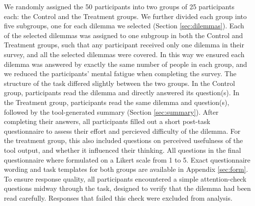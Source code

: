 We randomly assigned the 50 participants into two groups of 25 participants each: the Control and the Treatment groups.
We further divided each group into five subgroups, one for each dilemma we selected (Section \ref{sec:dilemmas}).
Each of the selected dilemmas was assigned to one subgroup in both the Control and Treatment groups, such that any participant received only one dilemma in their survey, and all the selected dilemmas were covered.
In this way we ensured each dilemma was answered by exactly the same number of people in each group, and we reduced the participants' mental fatigue when completing the survey.
The structure of the task differed slightly between the two groups.
In the Control group, participants read the dilemma and directly answered its question(s).
In the Treatment group, participants read the same dilemma and question(s), followed by the tool-generated summary (Section \ref{sec:summary}).
After completing their answers, all participants filled out a short post-task questionnaire to assess their effort and percieved difficulty of the dilemma.
For the treatment group, this also included questions on perceived usefulness of the tool output, and whether it influenced their thinking.
All questions in the final questionnaire where formulated on a Likert scale from 1 to 5.
Exact questionnaire wording and task templates for both groups are available in Appendix \ref{sec:form}.
To ensure response quality, all participants encountered a simple attention-check questions midway through the task, designed to verify that the dilemma had been read carefully. Responses that failed this check were excluded from analysis.
